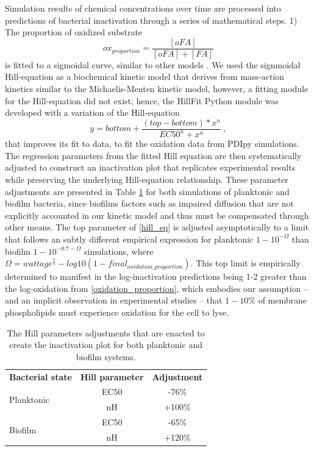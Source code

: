 Simulation results of chemical concentrations over time are processed into predictions of bacterial inactivation through a series of mathematical steps. 1) The proportion of oxidized substrate
\begin{equation} \label{oxidation_proportion}
    ox_{proportion} = \frac{[oFA]}{[oFA]+[FA]}
\end{equation}
is fitted to a sigmoidal curve, similar to other models \cite{Xiong1999AInactivation}. We used the signmoidal Hill-equation \cite{Gesztelyi2012ThePharmacology} as a biochemical kinetic model that derives from mass-action kinetics similar to the Michaelis-Menten kinetic model, however, a fitting module for the Hill-equation did not exist; hence, the HillFit Python module was developed with a variation of the Hill-equation \cite{Inoue2016OscillationActivation} 
\begin{equation} \label{hill_eq}
    y=bottom+\frac{(top-bottom)*x^n}{EC50^n+x^n}~,
\end{equation}
that improves its fit to data, to fit the oxidation data from PDIpy simulations. The regression parameters from the fitted Hill equation are then systematically adjusted to construct an inactivation plot that replicates experimental results while preserving the underlying Hill-equation relationship. These parameter adjustments are presented in Table \ref{hill_parameters} for both simulations of planktonic and biofilm bacteria, since biofilms factors such as impaired diffusion that are not explicitly accounted in our kinetic model and thus must be compensated through other means. The top parameter of \cref{hill_eq} is adjusted asymptotically to a limit that follows an subtly different empirical expression for planktonic $1-10^{-\Omega}$ than biofilm $1-10^{-0.7-\Omega }$ simulations, where $\Omega = wattage^{\frac{1}{5}}-log10(1-final_{oxidation\_proportion})$. This top limit is empirically determined to manifest in the log-inactivation predictions being 1-2 greater than the log-oxidation from \cref{oxidation_proportion}, which embodies our assumption -- and an implicit observation in experimental studies -- that $1-10\%$ of membrane phospholipids must experience oxidation for the cell to lyse. 

\begin{table}[]
    \centering
    \begin{tabular}{l|c|c}
        \textbf{Bacterial state} & \textbf{Hill parameter} & \textbf{Adjustment} \\
        \multirow{2}{}{Planktonic} & EC50 & -76\% \\
         & nH & +100\% \\
         \midrule
         \multirow{2}{}{Biofilm} & EC50 & -65\% \\
         & nH & +120\% \\
    \end{tabular}
    \caption{
        The Hill parameters adjustments that are enacted to create the inactivation plot for both planktonic and biofilm systems. 
    }
    \label{hill_parameters}
\end{table}

